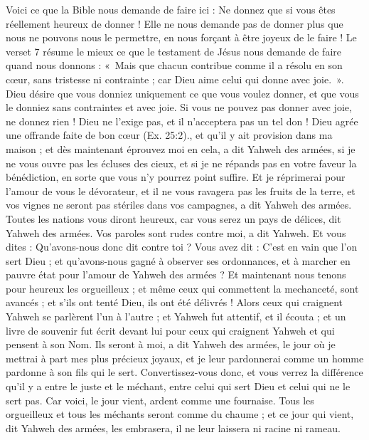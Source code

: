 \begin{multicols}{2}
{Voici ce que la Bible nous demande de faire ici : Ne donnez que si vous êtes réellement heureux de donner ! Elle ne nous demande pas de donner plus que nous ne pouvons nous le permettre, en nous forçant à être joyeux de le faire ! Le verset 7 résume le mieux ce que le testament de Jésus nous demande de faire quand nous donnons : «~Mais que chacun contribue comme il a résolu en son cœur, sans tristesse ni contrainte ; car Dieu aime celui qui donne avec joie.~». Dieu désire que vous donniez uniquement ce que vous voulez donner, et que vous le donniez sans contraintes et avec joie. Si vous ne pouvez pas donner avec joie, ne donnez rien ! 
Dieu ne l’exige pas, et il n’acceptera pas un tel don ! Dieu agrée une offrande faite de bon cœur (Ex. 25:2).}, et qu'il y ait provision dans ma maison ; et dès maintenant éprouvez moi en cela, a dit Yahweh des armées, si je ne vous ouvre pas les écluses des cieux, et si je ne répands pas en votre faveur la bénédiction, en sorte que vous n'y pourrez point suffire.
Et je réprimerai pour l'amour de vous le dévorateur, et il ne vous ravagera pas les fruits de la terre, et vos vignes ne seront pas stériles dans vos campagnes, a dit Yahweh des armées.
Toutes les nations vous diront heureux, car vous serez un pays de délices, dit Yahweh des armées.
Vos paroles sont rudes contre moi, a dit Yahweh. Et vous dites : Qu'avons-nous donc dit contre toi ?
Vous avez dit : C'est en vain que l’on sert Dieu ; et qu'avons-nous gagné à observer ses ordonnances, et à marcher en pauvre état pour l'amour de Yahweh des armées ?
Et maintenant nous tenons pour heureux les orgueilleux ; et même ceux qui commettent la mechanceté, sont avancés ; et s'ils ont tenté Dieu, ils ont été délivrés !
Alors ceux qui craignent Yahweh se parlèrent l'un à l’autre ; et Yahweh fut attentif, et il écouta ; et un livre de souvenir fut écrit devant lui pour ceux qui craignent Yahweh et qui pensent à son Nom.
Ils seront à moi, a dit Yahweh des armées, le jour où je mettrai à part mes plus précieux joyaux, et je leur pardonnerai comme un homme pardonne à son fils qui le sert.
Convertissez-vous donc, et vous verrez la différence qu'il y a entre le juste et le méchant, entre celui qui sert Dieu et celui qui ne le sert pas.
\VerseOne{}Car voici, le jour vient, ardent comme une fournaise. Tous les orgueilleux et tous les méchants seront comme du chaume ; et ce jour qui vient, dit Yahweh des armées, les embrasera, il ne leur laissera ni racine ni rameau.

\end{multicols}
